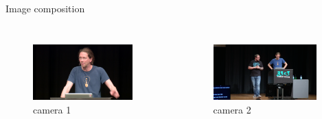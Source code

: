 \documentclass[hyperref={pdfpagelabels=false},aspectratio=169]{beamer}
\begin{document}
\begin{frame}{Image composition}
	\begin{columns}[T,onlytextwidth]
	\begin{figure} 
		\centering
		\def\svgwidth{1\textwidth}
		\includegraphics[width=0.9\textwidth]{closeup.png} \\camera 1
	\end{figure}
	\begin{figure} 
		\centering
		\def\svgwidth{1\textwidth}
		\includegraphics[width=0.93\textwidth]{medium.png} \\camera 2
	\end{figure}
\end{columns}
\end{frame}
\end{document}
